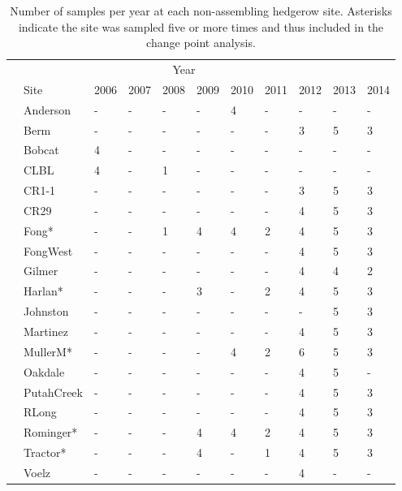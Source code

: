 \documentclass[12pt]{article}
\begin{document}
\begin{table}
  \renewcommand*\arraystretch{1.25}
  \centering
  \caption{Number of samples per year at each non-assembling hedgerow
    site. Asterisks indicate the site was sampled five or more times
    and thus included in the change point analysis.} 
  \begin{tabular}{lllllllllll}
    \hline
    \multicolumn{10}{c}{\hspace{10em}Year}\\
    & Site & 2006 & 2007 & 2008 & 2009 & 2010 & 2011 & 2012 & 2013 & 2014\\
    \hline
    &Anderson & - & - & - & - & 4 & - & - & - & - \\
    &Berm & - & - & - & - & - & - & 3 & 5 & 3\\
    &Bobcat & 4 & - & - & - & - & - & - & - & -\\
    &CLBL & 4 & - & 1 & - & - & - & - & - & -\\
    &CR1-1 & - & - & - & - & - & - & 3 & 5 & 3\\
    &CR29 & - & - & - & - & - & - & 4 & 5 & 3\\
    &Fong* & - & - & 1 & 4 & 4 & 2 & 4 & 5 & 3\\
    &FongWest & - & - & - & - & - & - & 4 & 5 & 3\\
    &Gilmer & - & - & - & - & - & - & 4 & 4 & 2 \\
    &Harlan* & - & - & - & 3 & - & 2 & 4 & 5 & 3\\
    &Johnston & - & - & - & - & - & - & - & 5 & 3 \\
    &Martinez & - & - & - & - & - & - & 4 & 5 & 3\\
    &MullerM* & - & - & - & - & 4 & 2 & 6 & 5 & 3\\
    &Oakdale & - & - & - & - & - & - & 4 & 5 & -\\
    &PutahCreek & - & - & - & - & - & - & 4 & 5 & 3\\
    &RLong & - & - & - & - & - & - & 4 & 5 & 3 \\
    &Rominger* & - & - & - & 4 & 4 & 2 & 4 & 5 & 3\\
    &Tractor* & - & - & - & 4 & - & 1 & 4 & 5 & 3\\
    &Voelz & - & - & - & - & - & - & 4 & - & -\\
    \hline
  \end{tabular}
  \label{tab:mature}
\end{table}
\clearpage
\end{document}
